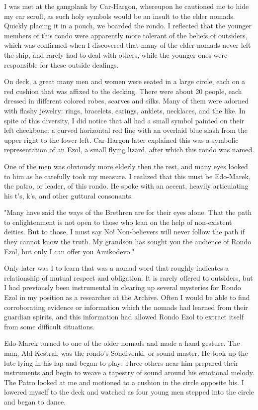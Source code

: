 \begin{multicols*}{2}
I was met at the gangplank by Car-Hargon, whereupon he cautioned me to hide my ear scroll, as such holy symbols would be an insult to the elder nomads. Quickly placing it in a pouch, we boarded the rondo. I reflected that the younger members of this rondo were apparently more tolerant of the beliefs of outsiders, which was confirmed when I discovered that many of the elder nomads never left the ship, and rarely had to deal with others, while the younger ones were responsible for these outside dealings.

On deck, a great many men and women were seated in a large circle, each on a red cushion that was affixed to the decking. There were about 20 people, each dressed in different colored robes, scarves and silks. Many of them were adorned with flashy jewelry: rings, bracelets, earings, anklets, necklaces, and the like. In spite of this diversity, I did notice that all had a small symbol painted on their left cheekbone: a curved horizontal red line with an overlaid blue slash from the upper right to the lower left. Car-Hargon later explained this was a symbolic representation of an Ezol, a small flying lizard, after which this rondo was named.

One of the men was obviously more elderly then the rest, and many eyes looked to him as he carefully took my measure. I realized that this must be Edo-Marek, the patro, or leader, of this rondo. He spoke with an accent, heavily articulating his t's, k's, and other guttural consonants.

"Many have said the ways of the Brethren are for their eyes alone. That the path to enlightenment is not open to those who lean on the help of non-existent deities. But to those, I must say No! Non-believers will never follow the path if they cannot know the truth. My grandson has sought you the audience of Rondo Ezol, but only I can offer you Amikodevo."

Only later was I to learn that  was a nomad word that roughly indicates a relationship of mutual respect and obligation. It is rarely offered to outsiders, but I had previously been instrumental in clearing up several mysteries for Rondo Ezol in my position as a researcher at the Archive. Often I would be able to find corroborating evidence or information which the nomads had learned from their guardian spirits, and this information had allowed Rondo Ezol to extract itself from some difficult situations.

Edo-Marek turned to one of the older nomads and made a hand gesture. The man, Ald-Kestral, was the rondo's Sondivenki, or sound master. He took up the lute lying in his lap and began to play. Three others near him prepared their instruments and begin to weave a tapestry of sound around his emotional melody. The Patro looked at me and motioned to a cushion in the circle opposite his. I lowered myself to the deck and watched as four young men stepped into the circle and began to dance.


\end{multicols*}
